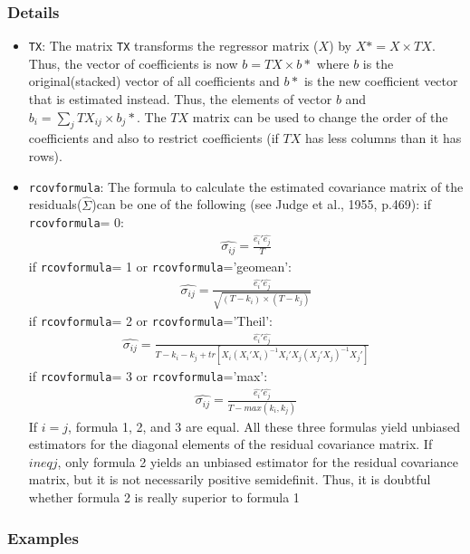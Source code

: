 \documentclass[12pt]{book}%
\begin{document}
\subsubsection{Details}
\label{details}
\begin{itemize}
\item \texttt{TX}: The matrix \texttt{TX} transforms the regressor matrix 
($X$) by $X\ast=X \times TX$. Thus,
the vector of coefficients is now $b=TX \times b\ast$ where $b$ is the 
original(stacked) 
vector of all coefficients and $b\ast$ is the new coefficient vector 
that is estimated instead.
Thus, the elements of vector $b$ and $b_i = \sum_j TX_{ij}\times b_j\ast$. The $TX$ matrix can be
used to change the order of the coefficients and also to restrict coefficients (if $TX$ has 
less columns than it has rows).
\item \texttt{rcovformula}: The formula to calculate the estimated covariance matrix of the residuals($\hat{\Sigma}$)can be one
of the following (see Judge et al., 1955, p.469):
if \texttt{rcovformula}= 0:
\begin{eqnarray*}
\hat{\sigma_{ij}}= \frac{\hat{e_i}\prime\hat{e_j}}{T}
\end{eqnarray*}
if \texttt{rcovformula}= 1 or \texttt{rcovformula}='geomean':
\begin{eqnarray*}
\hat{\sigma_{ij}}= \frac{\hat{e_i}\prime\hat{e_j}}{\sqrt{(T-k_i)\times (T-k_j)}}
\end{eqnarray*}
if \texttt{rcovformula}= 2 or \texttt{rcovformula}='Theil':
\begin{eqnarray*}
\hat{\sigma_{ij}}= \frac{\hat{e_i}\prime\hat{e_j}}{T-k_i-k_j+tr[X_i(X_i\prime X_i)^{-1}X_i\prime X_j(X_j\prime X_j)^{-1}X_j\prime]}
\end{eqnarray*}
if \texttt{rcovformula}= 3 or \texttt{rcovformula}='max':
\begin{eqnarray*}
\hat{\sigma_{ij}}= \frac{\hat{e_i}\prime\hat{e_j}}{T-max(k_i,k_j)}
\end{eqnarray*}
If $i = j$, formula 1, 2, and 3 are equal. All these three formulas yield unbiased estimators
for the diagonal elements of the residual covariance matrix. If $i neq j$, only formula 2
yields an unbiased estimator for the residual covariance matrix, but it is not necessarily
positive semidefinit. Thus, it is doubtful whether formula 2 is really superior to formula 1
\end{itemize}
\subsubsection{Examples}
\end{document}
